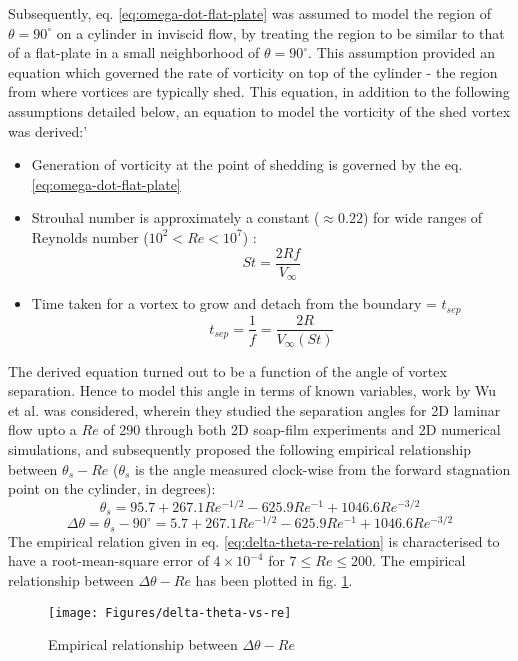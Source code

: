 Subsequently, eq. \ref{eq:omega-dot-flat-plate} was assumed to model the region of $\theta = 90^{\circ}$ on a cylinder in inviscid flow, by treating the region to be similar to that of a flat-plate in a small neighborhood of $\theta = 90^{\circ}$. This assumption provided an equation which governed the rate of vorticity on top of the cylinder - the region from where vortices are typically shed. This equation, in addition to the following assumptions detailed below, an equation to model the vorticity of the shed vortex was derived:'
\begin{itemize}
	\item Generation of vorticity at the point of shedding is governed by the eq. \ref{eq:omega-dot-flat-plate}
	\item Strouhal number is approximately a constant ($\approx 0.22$) for wide ranges of Reynolds number ($10^2 < Re < 10^7$) \parencite{White2018-ai}:
	\begin{equation}
		St = \frac{2 R f}{V_{\infty}}
	\end{equation}
	\item Time taken for a vortex to grow and detach from the boundary = $t_{sep}$
	\begin{equation}
		t_{sep} = \frac{1}{f} = \frac{2 R}{V_{\infty} (St)}
	\end{equation}
\end{itemize}
The derived equation turned out to be a function of the angle of vortex separation. Hence to model this angle in terms of known variables, work by Wu et al. \parencite{Wu2004} was considered, wherein they studied the separation angles for 2D laminar flow upto a $Re$ of 290 through both 2D soap-film experiments and 2D numerical simulations, and subsequently proposed the following empirical relationship between $\theta_s - Re$ ($\theta_s$ is the angle measured clock-wise from the forward stagnation point on the cylinder, in degrees):
\begin{equation}
	\theta_s = 95.7 + 267.1 Re^{-1/2} - 625.9 Re^{-1} + 1046.6 Re^{-3/2}
\end{equation}
\begin{equation}
	\Delta \theta = \theta_s - 90^{\circ} = 5.7 + 267.1 Re^{-1/2} - 625.9 Re^{-1} + 1046.6 Re^{-3/2}
	\label{eq:delta-theta-re-relation}
\end{equation}
The empirical relation given in eq. \ref{eq:delta-theta-re-relation} is characterised to have a root-mean-square error of $4 \times 10^{-4}$ for $7 \leq Re \leq 200$. The empirical relationship between $\Delta \theta - Re$ has been plotted in fig. \ref{fig:delta-theta-vs-re}.
\begin{figure}[H]
	\centering
	\texttt{[image: Figures/delta-theta-vs-re]}
	\caption{Empirical relationship between $\Delta \theta - Re$}
	\label{fig:delta-theta-vs-re}
\end{figure}

